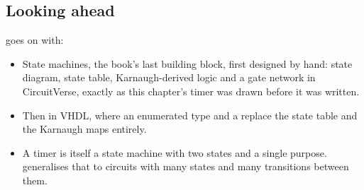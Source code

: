 \subsection*{Looking ahead}
 goes on with:
\begin{itemize}
  \item State machines, the book's last building block, first designed by hand: state diagram,
    state table, Karnaugh-derived logic and a gate network in CircuitVerse, exactly as this
    chapter's timer was drawn before it was written.
  \item Then in VHDL, where an enumerated type and a  replace the state table and the
    Karnaugh maps entirely.
  \item A timer is itself a state machine with two states and a single purpose. 
    generalises that to circuits with many states and many transitions between them.
\end{itemize}
